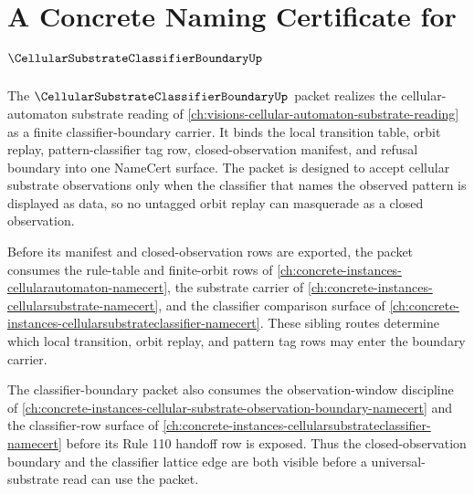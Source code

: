 \chapter{A Concrete Naming Certificate for $\CellularSubstrateClassifierBoundaryUp$}
\label{ch:concrete-instances-cellular-substrate-classifier-boundary-namecert}

The $\CellularSubstrateClassifierBoundaryUp$ packet realizes the cellular-automaton substrate reading of \autoref{ch:visions-cellular-automaton-substrate-reading} as a finite classifier-boundary carrier. It binds the local transition table, orbit replay, pattern-classifier tag row, closed-observation manifest, and refusal boundary into one NameCert surface. The packet is designed to accept cellular substrate observations only when the classifier that names the observed pattern is displayed as data, so no untagged orbit replay can masquerade as a closed observation.

Before its manifest and closed-observation rows are exported, the packet consumes the rule-table and finite-orbit rows of \autoref{ch:concrete-instances-cellularautomaton-namecert}, the substrate carrier of \autoref{ch:concrete-instances-cellularsubstrate-namecert}, and the classifier comparison surface of \autoref{ch:concrete-instances-cellularsubstrateclassifier-namecert}. These sibling routes determine which local transition, orbit replay, and pattern tag rows may enter the boundary carrier.

The classifier-boundary packet also consumes the observation-window discipline of \autoref{ch:concrete-instances-cellular-substrate-observation-boundary-namecert} and the classifier-row surface of \autoref{ch:concrete-instances-cellularsubstrateclassifier-namecert} before its Rule 110 handoff row is exposed. Thus the closed-observation boundary and the classifier lattice edge are both visible before a universal-substrate read can use the packet.

